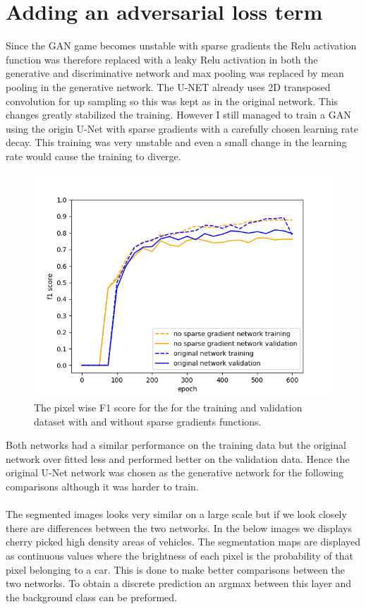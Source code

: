 \documentclass{kththesis}
\begin{document}
\section{Adding an adversarial loss term}
Since the GAN game becomes unstable with sparse gradients the Relu activation function was therefore replaced with a leaky Relu activation in both the generative and discriminative network and max pooling was replaced by mean pooling in the generative network. The U-NET already uses 2D transposed convolution for up sampling so this was kept as in the original network. This changes greatly stabilized the training. However I still managed to train a GAN using the origin U-Net with sparse gradients with a carefully chosen learning rate decay. This training was very unstable and even a small change in the learning rate would cause the training to diverge.
\begin{center}
\begin{figure}[H]
\centering
      \includegraphics[scale=0.6]{mean_max_2}
  \caption{The pixel wise F1 score for the for the training and validation dataset with and without sparse gradients functions.} \label{fig:sparse}
\end{figure}
\end{center}
Both networks had a similar performance on the training data but the original network over fitted less and performed better on the validation data. Hence the original U-Net network was chosen as the generative network for the following comparisons although it was harder to train.\\
\\
The segmented images looks very similar on a large scale but if we look closely there are differences between the two networks. In the below images we displays cherry picked high density areas of vehicles. The segmentation maps are displayed as continuous values where the brightness of each pixel is the probability of that pixel belonging to a car. This is done to make better comparisons between the two networks. To obtain a discrete prediction an argmax between this layer and the background class can be preformed.
\end{document}
